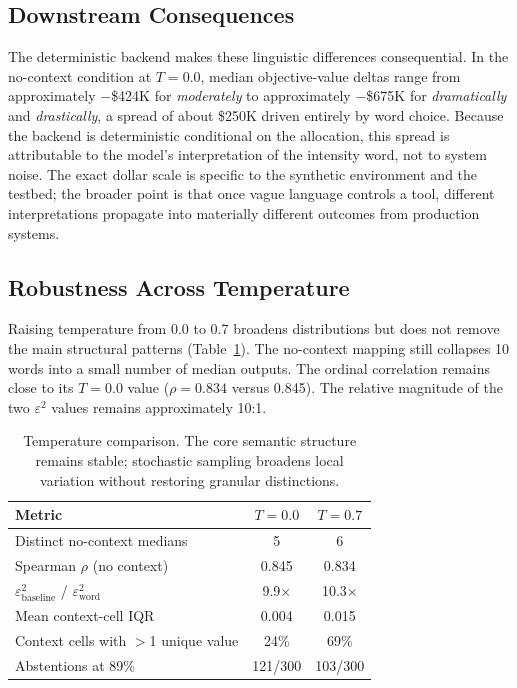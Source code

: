 \documentclass[11pt]{article}
\begin{document}
\subsection{Downstream Consequences}

The deterministic backend makes these linguistic differences consequential. In the no-context condition at $T{=}0.0$, median objective-value deltas range from approximately $-$\$424K for \textit{moderately} to approximately $-$\$675K for \textit{dramatically} and \textit{drastically}, a spread of about \$250K driven entirely by word choice. Because the backend is deterministic conditional on the allocation, this spread is attributable to the model's interpretation of the intensity word, not to system noise. The exact dollar scale is specific to the synthetic environment and the testbed; the broader point is that once vague language controls a tool, different interpretations propagate into materially different outcomes from production systems.

\subsection{Robustness Across Temperature}

Raising temperature from 0.0 to 0.7 broadens distributions but does not remove the main structural patterns (Table~\ref{tab:tempcomp}). The no-context mapping still collapses 10 words into a small number of median outputs. The ordinal correlation remains close to its $T{=}0.0$ value ($\rho = 0.834$ versus 0.845). The relative magnitude of the two $\varepsilon^2$ values remains approximately 10:1.

\begin{table}[H]
\centering
\small
\begin{tabular}{lcc}
\toprule
\textbf{Metric} & $T{=}0.0$ & $T{=}0.7$ \\
\midrule
Distinct no-context medians & 5 & 6 \\
Spearman $\rho$ (no context) & 0.845 & 0.834 \\
$\varepsilon^2_\text{baseline}$ / $\varepsilon^2_\text{word}$ & 9.9$\times$ & 10.3$\times$ \\
Mean context-cell IQR & 0.004 & 0.015 \\
Context cells with $>$1 unique value & 24\% & 69\% \\
Abstentions at 89\% & 121/300 & 103/300 \\
\bottomrule
\end{tabular}
\caption{Temperature comparison. The core semantic structure remains stable; stochastic sampling broadens local variation without restoring granular distinctions.}
\label{tab:tempcomp}
\end{table}
\end{document}
